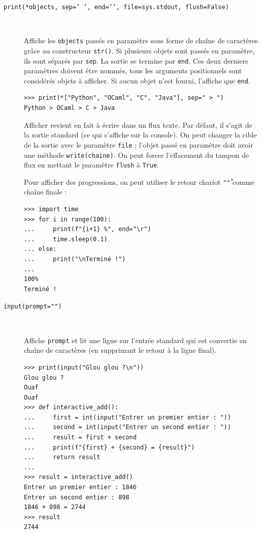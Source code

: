 \documentclass[a4paper, 10pt]{article}
\begin{document}
\begin{description}
    \item[\texttt{print(*objects, sep=' ', end='\n', file=sys.stdout, flush=False)}]~
    
    Affiche les \texttt{objects} passés en paramètre sous forme de chaîne de caractères grâce au constructeur \texttt{str()}. Si plusieurs objets sont passés en paramètre, ils sont séparés par \texttt{sep}. La sortie se termine par \texttt{end}. Ces deux derniers paramètres doivent être nommés, tous les arguments positionnels sont considérés objets à afficher. Si aucun objet n'est fourni, l'affiche que \texttt{end}.
    
    \begin{verbatim}
>>> print(*["Python", "OCaml", "C", "Java"], sep=" > ")
Python > OCaml > C > Java
    \end{verbatim}
    
    Afficher revient en fait à écrire dans un flux texte. Par défaut, il s'agit de la sortie standard (ce qui s'affiche sur la console). On peut changer la cible de la sortie avec le paramètre \texttt{file} ; l'objet passé en paramètre doit avoir une méthode \texttt{write(chaine)}. On peut forcer l'effacement du tampon de flux en mettant le paramètre \texttt{flush} à \texttt{True}.\medskip

    Pour afficher des progressions, on peut utiliser le retour chariot \texttt{"\r"} comme chaîne finale :

    \begin{verbatim}
>>> import time
>>> for i in range(100):
...     print(f"{i+1} %", end="\r")
...     time.sleep(0.1)
... else:
...     print("\nTerminé !")
...
100%
Terminé !
    \end{verbatim}

    \item[\texttt{input(prompt="")}]~ 
    
    Affiche \texttt{prompt} et lit une ligne sur l'entrée standard qui est convertie en chaîne de caractères (en supprimant le retour à la ligne final).

    \begin{verbatim}
>>> print(input("Glou glou ?\n"))
Glou glou ?
Ouaf
Ouaf
>>> def interactive_add():
...     first = int(input("Entrer un premier entier : "))
...     second = int(input("Entrer un second entier : "))
...     result = first + second
...     print(f"{first} + {second} = {result}")
...     return result
...
>>> result = interactive_add()
Entrer un premier entier : 1846
Entrer un second entier : 898
1846 + 898 = 2744
>>> result
2744
    \end{verbatim}

\end{description}
\end{document}
